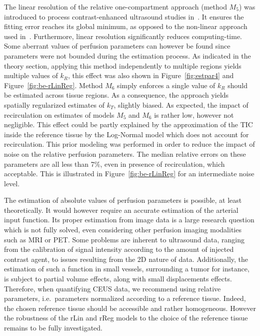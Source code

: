 The linear resolution of the relative one-compartment approach (method $M_5$) was introduced to process contrast-enhanced ultrasound studies in~\cite{Doury2016fi}. It ensures the fitting error reaches its global minimum, as opposed to the non-linear approach used in~\cite{Doury2017wn}. Furthermore, linear resolution significantly reduces computing-time. Some aberrant values of perfusion parameters can however be found since parameters were not bounded during the estimation process. As indicated in the theory section, applying this method independently to multiple regions yields multiple values of $k_R$, this effect was also shown in Figure~\ref{fig:estpar4} and Figure~\ref{fig:be-rLinReg}. Method $M_6$ simply enforces a single value of $k_R$ should be estimated across tissue regions. As a consequence, the approach yields spatially regularized estimates of $k_T$, slightly biased. As expected, the impact of recirculation on estimates of models $M_5$ and $M_6$ is rather low, however not negligible. This effect could be partly explained by the approximation of the TIC inside the reference tissue by the Log-Normal model which does not account for recirculation. This prior modeling was performed in order to reduce the impact of noise on the relative perfusion parameters.
The median relative errors on these parameters are all less than 7\%, even in presence of recirculation, which acceptable. This is illustrated in Figure~\ref{fig:be-rLinReg} for an intermediate noise level. 

The estimation of absolute values of perfusion parameters is possible, at least theoretically. It would however require an accurate estimation of the arterial input function. Its proper estimation from image data is a large research question which is not fully solved, even considering other perfusion imaging modalities such as MRI or PET. Some problems are inherent to ultrasound data, ranging from the calibration of signal intensity according to the amount of injected contrast agent, to issues resulting from the 2D nature of data. Additionally, the estimation of such a function in small vessels, surrounding a tumor for instance, is subject to partial volume effects, along with small displacements effects. Therefore, when quantifying CEUS data, we recommend using relative parameters, i.e.~parameters normalized according to a reference tissue. Indeed, the chosen reference tissue should be accessible and rather homogeneous. However the robustness of the rLin and rReg models to the choice of the reference tissue remains to be fully investigated.
 
